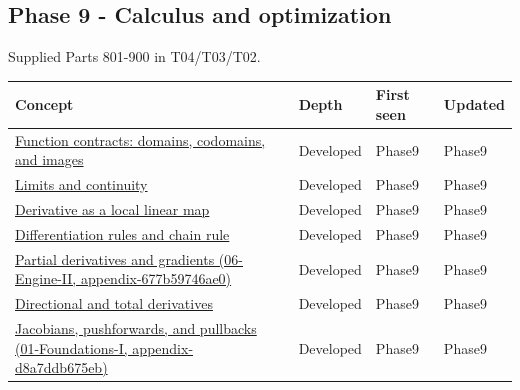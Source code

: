 \subsection{Phase 9 - Calculus and optimization}\label{appendix-a6d556a4ef50-phase-9---calculus-and-optimization}

Supplied Parts 801-900 in T04/T03/T02.

{\def\LTcaptype{none} %
\begin{longtable}[]{@{}
  >{\raggedright\arraybackslash}p{}
  >{\raggedright\arraybackslash}p{}
  >{\raggedright\arraybackslash}p{}
  >{\raggedright\arraybackslash}p{}@{}}
\toprule\noalign{}
\begin{minipage}[b]{\linewidth}\raggedright
Concept
\end{minipage} & \begin{minipage}[b]{\linewidth}\raggedright
Depth
\end{minipage} & \begin{minipage}[b]{\linewidth}\raggedright
First seen
\end{minipage} & \begin{minipage}[b]{\linewidth}\raggedright
Updated
\end{minipage} \\
\midrule\noalign{}
\endhead
\bottomrule\noalign{}
\endlastfoot
\hyperref[appendix-a59658325cd6]{Function contracts: domains, codomains, and images} & Developed & Phase9 & Phase9 \\
\hyperref[appendix-fecc1847f5a3]{Limits and continuity} & Developed & Phase9 & Phase9 \\
\hyperref[appendix-7bc181935c42]{Derivative as a local linear map} & Developed & Phase9 & Phase9 \\
\hyperref[appendix-d9f70bdfbc92]{Differentiation rules and chain rule} & Developed & Phase9 & Phase9 \\
\href{../06-Engine-II/main.pdf\#nameddest=appendix-677b59746ae0}{Partial derivatives and gradients (06-Engine-II, appendix-677b59746ae0)} & Developed & Phase9 & Phase9 \\
\hyperref[appendix-e2d476574aab]{Directional and total derivatives} & Developed & Phase9 & Phase9 \\
\href{../01-Foundations-I/main.pdf\#nameddest=appendix-d8a7ddb675eb}{Jacobians, pushforwards, and pullbacks (01-Foundations-I, appendix-d8a7ddb675eb)} & Developed & Phase9 & Phase9 \\

\end{longtable}}

